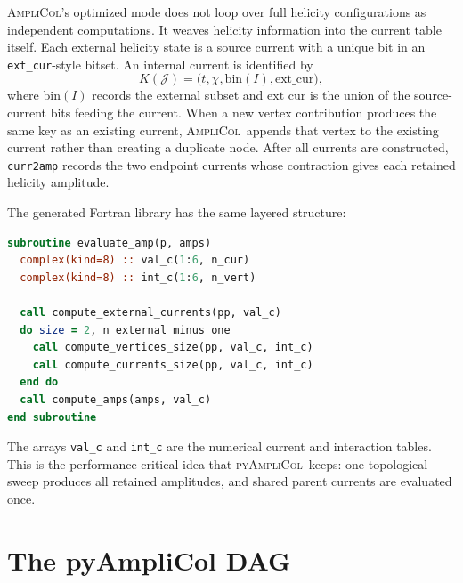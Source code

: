 \documentclass[10pt]{article}
\newcommand{\AC}{\textsc{AmpliCol}}
\newcommand{\PAC}{\textsc{pyAmpliCol}}
\newcommand{\J}{\mathcal{J}}
\begin{document}
\AC's optimized mode does not loop over full helicity configurations as
independent computations.  It weaves helicity information into the current
table itself.  Each external helicity state is a source current with a unique
bit in an \texttt{ext\_cur}-style bitset.  An internal current is identified by
\begin{equation}
  K(\J)=\bigl(t,\chi,\mathrm{bin}(I),\mathrm{ext\_cur}\bigr),
  \label{eq:current-key}
\end{equation}
where $\mathrm{bin}(I)$ records the external subset and $\mathrm{ext\_cur}$ is
the union of the source-current bits feeding the current.  When a new vertex
contribution produces the same key as an existing current, \AC\ appends that
vertex to the existing current rather than creating a duplicate node.  After
all currents are constructed, \texttt{curr2amp} records the two endpoint
currents whose contraction gives each retained helicity amplitude.

The generated Fortran library has the same layered structure:
\begin{lstlisting}[language=Fortran]
subroutine evaluate_amp(p, amps)
  complex(kind=8) :: val_c(1:6, n_cur)
  complex(kind=8) :: int_c(1:6, n_vert)

  call compute_external_currents(pp, val_c)
  do size = 2, n_external_minus_one
    call compute_vertices_size(pp, val_c, int_c)
    call compute_currents_size(pp, val_c, int_c)
  end do
  call compute_amps(amps, val_c)
end subroutine
\end{lstlisting}
The arrays \texttt{val\_c} and \texttt{int\_c} are the numerical current and
interaction tables.  This is the performance-critical idea that \PAC\ keeps:
one topological sweep produces all retained amplitudes, and shared parent
currents are evaluated once.

\section{The pyAmpliCol DAG}
\end{document}
